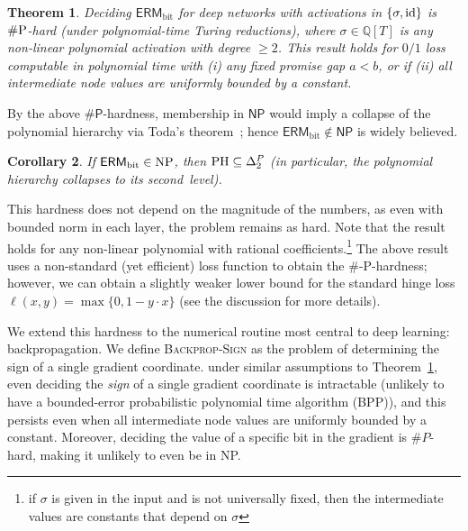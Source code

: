 \documentclass{article}
\newcommand{\id}{\textnormal{id}}
\newcommand{\Q}{\mathbb{Q}}
\theoremstyle{plain}
\newtheorem{theorem}{Theorem}[section]
\newtheorem{corollary}[theorem]{Corollary}
\theoremstyle{definition}
\theoremstyle{remark}
\begin{document}
\begin{theorem}
		\label{thm:SLP}
    Deciding $\mathsf{ERM}_{\text{bit}}$ for deep networks with activations in $\{\sigma,\id\}$ is $\textnormal{\#P}$-hard (under polynomial-time Turing reductions), where $\sigma \in \Q[T]$ is any non-linear polynomial activation with degree $ \ge 2$. This result holds for $0/1$ loss computable in polynomial time with (i) any fixed promise gap $a<b$, or if (ii) all intermediate node values are uniformly bounded by a constant.  
\end{theorem}


By the above $\#\mathsf{P}$-hardness, membership in $\mathsf{NP}$ would imply a collapse of the polynomial hierarchy via Toda's theorem~\cite{toda1991pp}; hence $\mathsf{ERM}_{\text{bit}}\notin\mathsf{NP}$ is widely believed.


\begin{corollary}
If $\mathsf{ERM}_{\text{bit}} \in \textnormal{NP}$, then $\textnormal{PH} \subseteq \Delta_2^P$
(in particular, the polynomial hierarchy collapses to its second~level).
\end{corollary}

This hardness does not depend on the magnitude of the numbers, as even with bounded norm in each layer, the problem remains as hard. Note that the result holds for any non-linear polynomial with rational coefficients.\footnote{if $\sigma$ is given in the input and is not universally fixed, then the intermediate values are constants that depend on $\sigma$} The above result uses a non-standard (yet efficient) loss function to obtain the $\#$-P-hardness; however, we can obtain a slightly weaker lower bound for the standard hinge loss $\ell(x,y) = \max\{0,1-y\cdot x\}$ (see the discussion for more details). 



We extend this hardness to the numerical routine most central to deep learning: backpropagation. We define \textsc{Backprop-Sign} as the problem of determining the sign of a single gradient coordinate. under similar assumptions to Theorem~\ref{thm:SLP}, even deciding the \emph{sign} of a single gradient coordinate is
intractable (unlikely to have a bounded-error probabilistic polynomial time algorithm (BPP)), and this persists even when all intermediate node values are
uniformly bounded by a constant. Moreover, deciding the value of a specific bit in the gradient is $\#P$-hard, making it unlikely to even be in NP. 
\end{document}
